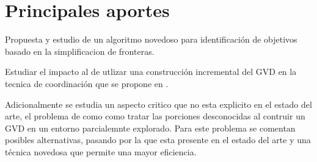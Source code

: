 \section{Principales aportes}
Propuesta y estudio de un algoritmo novedoso para identificación de objetivos
basado en la simplificacion de fronteras.

Estudiar el impacto al de utlizar una construcción incremental del GVD en la
tecnica de coordinación que se propone en \cite{wurm2008coordinated}. 

Adicionalmente se estudia un aspecto critico que no esta explicito en el estado
del arte, el problema de como como tratar las porciones desconocidas al
contruir un GVD en un entorno parcialemnte explorado. Para este problema se
comentan posibles alternativas, pasando por la que esta presente en el estado
del arte y una técnica novedosa que permite una mayor eficiencia.

